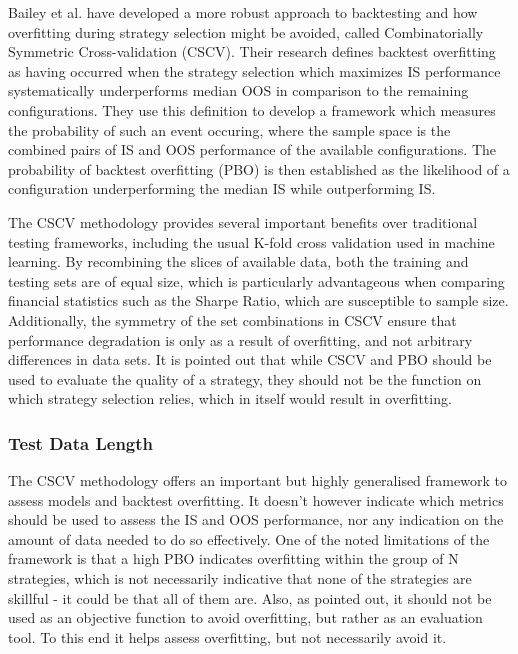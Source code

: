 \documentclass[a4paper,11pt,oneside]{article}
\theoremstyle{plain}
\theoremstyle{definition}
\begin{document}
Bailey et al. \cite{BailyPBO} have developed a more robust approach to backtesting and how overfitting during strategy 
selection might be avoided, called Combinatorially Symmetric Cross-validation (CSCV). Their research defines backtest overfitting as having occurred when the strategy selection which maximizes IS performance systematically underperforms median OOS in comparison to the remaining configurations. They use this definition to develop a framework which measures the probability of such an event occuring, where the sample space is the combined pairs of IS and OOS performance of the available configurations. The probability of backtest overfitting (PBO) is then established as the likelihood of a configuration underperforming the median IS while outperforming IS. 
\hfill \break 

The CSCV methodology provides several important benefits over traditional testing 
frameworks, including the usual K-fold cross validation used in machine learning. By recombining the slices of 
available data, both the training and testing sets are of equal size, which is particularly advantageous when comparing 
financial statistics such as the Sharpe Ratio, which are susceptible to sample size. Additionally, the symmetry 
of the set combinations in CSCV ensure that performance degradation is only as a result of overfitting, and not 
arbitrary differences in data sets. It is pointed out that while CSCV and PBO should be used to evaluate the quality 
of a strategy, they should not be the function on which strategy selection relies, which in itself would result in overfitting.
\hfill \break 

\subsubsection{Test Data Length}

The CSCV methodology offers an important but highly generalised framework to assess models and backtest 
overfitting. It doesn’t however indicate which metrics should be used to assess the IS and OOS performance, nor 
any indication on the amount of data needed to do so effectively. One of the noted limitations of the framework is 
that a high PBO indicates overfitting within the group of N strategies, which is not necessarily indicative that none 
of the strategies are skillful - it could be that all of them are. Also, as pointed out, it should not be used as an 
objective function to avoid overfitting, but rather as an evaluation tool. To this end it helps assess overfitting, but 
not necessarily avoid it. 
\hfill \break 
\end{document}
